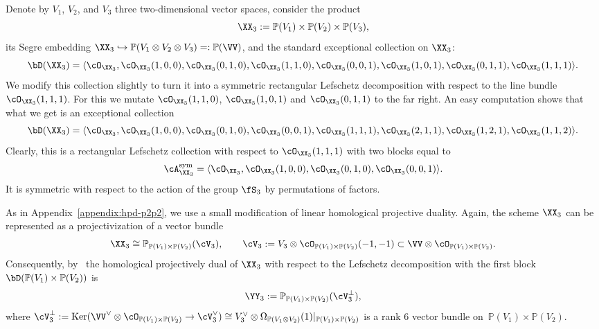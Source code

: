 \documentclass[11pt]{amsart}
\renewcommand{\P}{{\mathbb{P}}}
\DeclareMathOperator{\Ker}{\mathrm{Ker}}
\theoremstyle{plain}
\theoremstyle{definition}
\theoremstyle{remark}
\begin{document}
Denote by $V_1$, $V_2$, and $V_3$ three two-dimensional vector spaces, consider the product
\begin{equation*}
{\XX_3} := \P(V_1) \times \P(V_2) \times \P(V_3),
\end{equation*}
its Segre embedding $\XX_3  \hookrightarrow \P(V_1 \otimes V_2 \otimes V_3) =: \P(\VV)$,
and the standard exceptional collection on ${\XX_3}$:
\begin{equation*}
\bD({\XX_3}) = \langle  \cO_{\XX_3}, \cO_{\XX_3}(1,0,0), \cO_{\XX_3}(0,1,0), \cO_{\XX_3}(1,1,0), \cO_{\XX_3}(0,0,1), \cO_{\XX_3}(1,0,1), \cO_{\XX_3}(0,1,1), \cO_{\XX_3}(1,1,1) \rangle. 
\end{equation*}
We modify this collection slightly to turn it into a symmetric rectangular Lefschetz decomposition with respect to the line bundle $\cO_{\XX_3}(1,1,1)$.
For this we mutate $\cO_{\XX_3}(1,1,0)$, $\cO_{\XX_3}(1,0,1)$ and $\cO_{\XX_3}(0,1,1)$ to the far right.
An easy computation shows that what we get is an exceptional collection
\begin{equation*}
\bD({\XX_3}) = \langle  
\cO_{\XX_3}, \cO_{\XX_3}(1,0,0), \cO_{\XX_3}(0,1,0), \cO_{\XX_3}(0,0,1), 
\cO_{\XX_3}(1,1,1), \cO_{\XX_3}(2,1,1), \cO_{\XX_3}(1,2,1), \cO_{\XX_3}(1,1,2) 
\rangle. 
\end{equation*}
Clearly, this is a rectangular Lefschetz collection with respect to $\cO_{\XX_3}(1,1,1)$ with two blocks equal to 
\begin{equation}
\label{eq:xx-lefschetz}
\cA_{\XX_3}^{\rm{sym}} = \langle  \cO_{\XX_3}, \cO_{\XX_3}(1,0,0), \cO_{\XX_3}(0,1,0), \cO_{\XX_3}(0,0,1) \rangle. 
\end{equation}
It is symmetric with respect to the action of the group $\fS_3$ by permutations of factors.

As in Appendix~\ref{appendix:hpd-p2p2}, we use a small modification of linear homological projective duality.
Again, the scheme $\XX_3$ can be represented as a projectivization of a vector bundle
\begin{equation*}
{\XX_3} \cong \P_{\P(V_1) \times \P(V_2)}(\cV_3),
\qquad 
\cV_3 := V_3\otimes \cO_{\P(V_1) \times \P(V_2)}(-1,-1) \subset \VV \otimes \cO_{\P(V_1) \times \P(V_2)}.
\end{equation*}
Consequently, by~\cite[Corollary~8.3]{kuznetsov2007hpd} the homological projectively dual of ${\XX_3}$ with respect to the Lefschetz decomposition with the first block $\bD(\P(V_1) \times \P(V_2))$ is
\begin{equation}\label{eq:def-yy3}
{\YY_3} := \P_{\P(V_1) \times \P(V_2)}(\cV_3^\perp),
\end{equation}
where $\cV_3^\perp := \Ker(\VV^\vee \otimes \cO_{\P(V_1) \times \P(V_2)} \to \cV_3^\vee) \cong V_3^\vee \otimes \Omega_{\P(V_1 \otimes V_2)}(1) \vert_{\P(V_1) \times \P(V_2)}$ is a rank 6 vector bundle on~$\P(V_1) \times \P(V_2)$.
\end{document}
